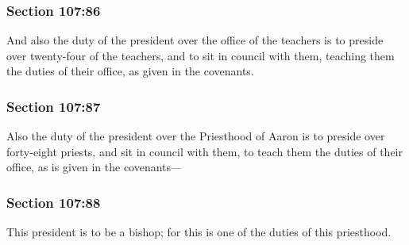 	\subsubsection{Section 107:86} %
		\label{DC107-86}

		And also the duty of the president over the office of the teachers is to preside over twenty-four of the teachers, and to sit in council with them, teaching them the duties of their office, as given in the covenants.


	\subsubsection{Section 107:87} %
		\label{DC107-87}

		Also the duty of the president over the Priesthood of Aaron is to preside over forty-eight priests, and sit in council with them, to teach them the duties of their office, as is given in the covenants---


	\subsubsection{Section 107:88} %
		\label{DC107-88}

		This president is to be a bishop; for this is one of the duties of this priesthood.


